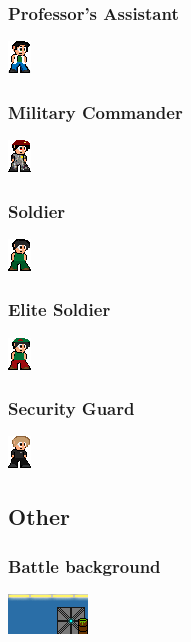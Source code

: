 \documentclass{article}
\begin{document}
\subsubsection{Professor's Assistant}
\includegraphics{./references/sprites/Assistant.png}
\subsubsection{Military Commander}
\includegraphics{./references/sprites/Commander.png}
\subsubsection{Soldier}
\includegraphics{./references/sprites/soldier.png}
\subsubsection{Elite Soldier}
\includegraphics{./references/sprites/Elite.png}	
\subsubsection{Security Guard}
\includegraphics{./references/sprites/Security.png}	
\subsection{Other}
\subsubsection{Battle background}
\includegraphics{./references/sprites/background.png}	
\end{document}
